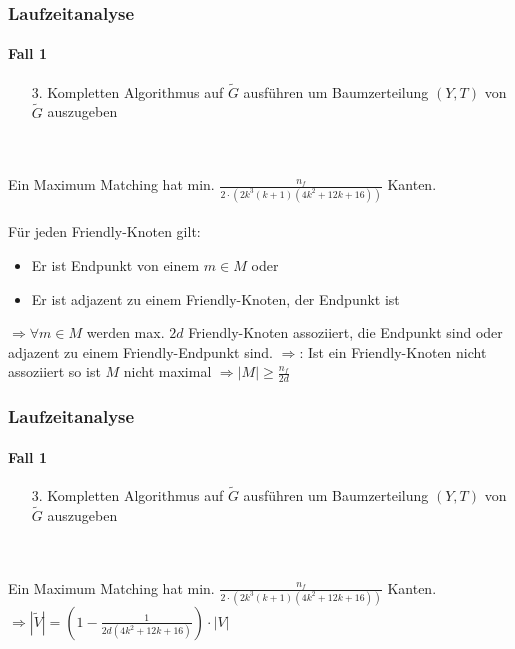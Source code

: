 \begin{frame} %
\frametitle{Laufzeitanalyse}
\framesubtitle{Fall 1}

\begin{enumerate}
	\item[3.] Kompletten Algorithmus auf $\widetilde{G}$ ausführen um Baumzerteilung $(Y,T)$ von $\widetilde{G}$ auszugeben
\end{enumerate}
\ \\
\ \\
Ein Maximum Matching hat min. $\frac{n_f}{2 \cdot (2k^3 (k+1) (4k^2 +12k + 16))}$ Kanten. \\
\ \\
Für jeden Friendly-Knoten gilt:
\begin{itemize}
	\item Er ist Endpunkt von einem $m \in M$ oder
	\item Er ist adjazent zu einem Friendly-Knoten, der Endpunkt ist
\end{itemize}
$\Rightarrow \forall m \in M$ werden max. $2d$ Friendly-Knoten assoziiert, die Endpunkt sind oder adjazent zu einem Friendly-Endpunkt sind.
$\Rightarrow$: Ist ein Friendly-Knoten nicht assoziiert so ist $M$ nicht maximal $\Rightarrow |M| \geq \frac{n_f}{2d}$
\end{frame}

\begin{frame} %
\frametitle{Laufzeitanalyse}
\framesubtitle{Fall 1}

\begin{enumerate}
	\item[3.] Kompletten Algorithmus auf $\widetilde{G}$ ausführen um Baumzerteilung $(Y,T)$ von $\widetilde{G}$ auszugeben
\end{enumerate}
\ \\
\ \\
Ein Maximum Matching hat min. $\frac{n_f}{2 \cdot (2k^3 (k+1) (4k^2 +12k + 16))}$ Kanten. \\
$\Rightarrow |\widetilde{V}| = (1 - \frac{1}{2d(4k^2+12k+16)}) \cdot |V|$
\end{frame}


